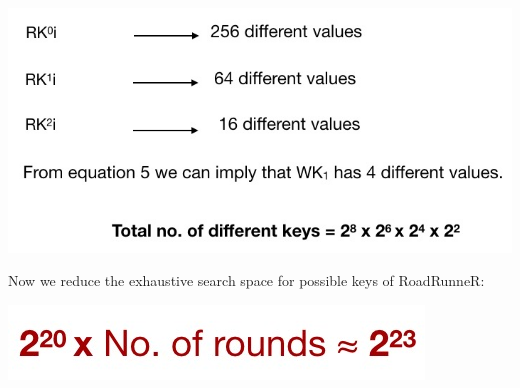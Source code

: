 \includegraphics[scale=0.70]{project/images/11.jpg}

Now we reduce the exhaustive search space for possible keys of RoadRunneR:

\hspace{3.5cm}\includegraphics[scale=0.60]{project/images/12.jpg}


